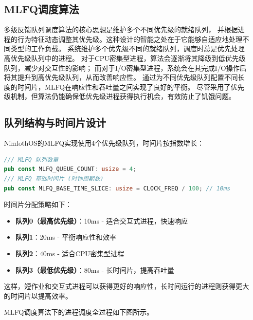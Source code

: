 \subsection{MLFQ调度算法}

多级反馈队列调度算法的核心思想是维护多个不同优先级的就绪队列，
并根据进程的行为特征动态调整其优先级。这种设计的智能之处在于它能够自适应地处理不同类型的工作负载。
系统维护多个优先级不同的就绪队列，调度时总是优先处理高优先级队列中的进程。
对于CPU密集型进程，算法会逐渐将其降级到低优先级队列，减少对交互性的影响；
而对于I/O密集型进程，系统会在其完成I/O操作后将其提升到高优先级队列，从而改善响应性。
通过为不同优先级队列配置不同长度的时间片，MLFQ在响应性和吞吐量之间实现了良好的平衡。
尽管采用了优先级机制，但算法仍能确保低优先级进程获得执行机会，有效防止了饥饿问题。

\subsection{队列结构与时间片设计}

NimlothOS的MLFQ实现使用4个优先级队列，时间片按指数增长：

\begin{lstlisting}[language=Rust,caption={MLFQ配置参数}, label={lst:mlfq-config}]
/// MLFQ 队列数量
pub const MLFQ_QUEUE_COUNT: usize = 4;
/// MLFQ 基础时间片 (时钟周期数)
pub const MLFQ_BASE_TIME_SLICE: usize = CLOCK_FREQ / 100; // 10ms
\end{lstlisting}

时间片分配策略如下：
\begin{itemize}
    \item \textbf{队列0（最高优先级）}：10ms - 适合交互式进程，快速响应
    \item \textbf{队列1}：20ms - 平衡响应性和效率
    \item \textbf{队列2}：40ms - 适合CPU密集型进程
    \item \textbf{队列3（最低优先级）}：80ms - 长时间片，提高吞吐量
\end{itemize}

这样，短作业和交互式进程可以获得更好的响应性，长时间运行的进程则获得更大的时间片以提高效率。

MLFQ调度算法下的进程调度全过程如下图所示。

